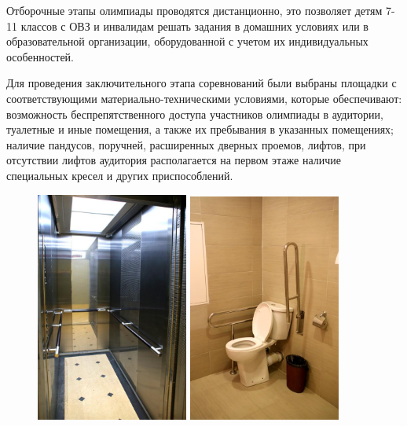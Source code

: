 Отборочные этапы олимпиады проводятся дистанционно, это позволяет детям 7-11 классов с ОВЗ и инвалидам решать задания в домашних условиях или в образовательной организации, оборудованной с учетом их индивидуальных особенностей.

Для проведения заключительного этапа соревнований были выбраны площадки с соответствующими материально-техническими условиями, которые обеспечивают: возможность беспрепятственного доступа участников олимпиады в аудитории, туалетные и иные помещения, а также их пребывания в указанных помещениях; наличие пандусов, поручней, расширенных дверных проемов, лифтов, при отсутствии лифтов аудитория располагается на первом этаже наличие специальных кресел и других приспособлений. 

\begin{figure}[H]
    \begin{center}
    \includegraphics[width=5cm]{history/info/smart_city/i2}
    \includegraphics[width=5cm]{history/info/smart_city/i3}
\end{center}
\end{figure}

